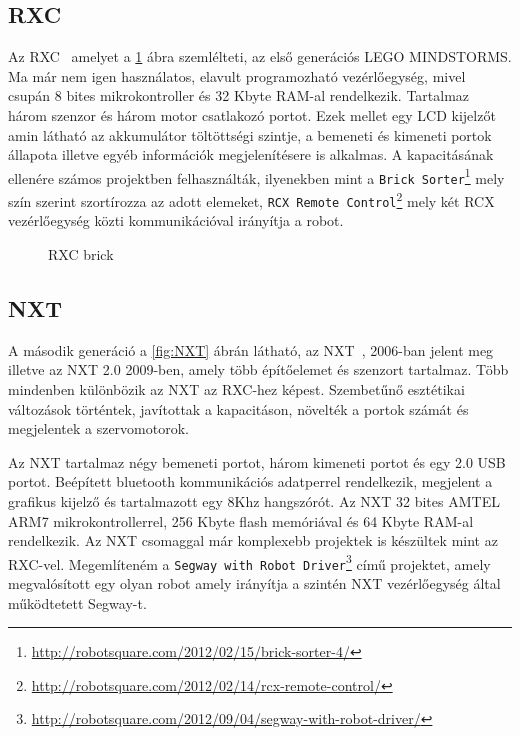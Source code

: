 \subsection{RXC}
Az RXC~\cite{rxcAttribution} amelyet a \ref{fig:RXC} ábra szemlélteti, az első generációs LEGO MINDSTORMS. Ma már nem igen használatos, elavult programozható vezérlőegység, mivel csupán 8 bites mikrokontroller és 32 Kbyte RAM-al rendelkezik. Tartalmaz három szenzor és három motor csatlakozó portot. Ezek mellet egy LCD kijelzőt amin látható az akkumulátor töltöttségi szintje, a bemeneti és kimeneti portok állapota illetve egyéb információk megjelenítésere is alkalmas. A kapacitásának ellenére számos projektben felhasználták, ilyenekben mint a \texttt{Brick Sorter}\footnote{\href {http://robotsquare.com/2012/02/15/brick-sorter-4/}{http://robotsquare.com/2012/02/15/brick-sorter-4/}} mely szín szerint szortírozza az adott elemeket, \texttt{RCX Remote Control}\footnote{\href {http://robotsquare.com/2012/02/14/rcx-remote-control/}{http://robotsquare.com/2012/02/14/rcx-remote-control/}} mely két RCX vezérlőegység közti kommunikációval irányítja a robot.

\begin{figure}[!htb]
	\centering
	\caption{RXC brick}
	\label{fig:RXC}
\end{figure}

\subsection{NXT}
A második generáció a \ref{fig:NXT} ábrán látható, az NXT~\cite{nxtAttribution}\cite{nxtVsEv3}, 2006-ban jelent meg illetve az NXT 2.0 2009-ben, amely több építőelemet és szenzort tartalmaz. Több mindenben különbözik az NXT az RXC-hez képest. Szembetűnő esztétikai változások történtek, javítottak a kapacitáson, növelték a portok számát és megjelentek a szervomotorok.

Az NXT tartalmaz négy bemeneti portot, három kimeneti portot és egy 2.0 USB portot. Beépített bluetooth kommunikációs adatperrel rendelkezik, megjelent a grafikus kijelző és tartalmazott egy 8Khz hangszórót. Az NXT 32 bites AMTEL ARM7 mikrokontrollerrel, 256 Kbyte flash memóriával és 64 Kbyte RAM-al rendelkezik. Az NXT csomaggal már komplexebb projektek is készültek mint az RXC-vel. Megemlíteném a \texttt{Segway with Robot Driver}\footnote{\href {http://robotsquare.com/2012/09/04/segway-with-robot-driver/}{http://robotsquare.com/2012/09/04/segway-with-robot-driver/}} című projektet, amely megvalósított egy olyan robot amely irányítja a szintén NXT vezérlőegység által működtetett Segway-t.

